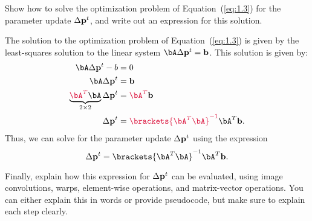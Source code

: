 \begin{problem}
\begin{enumroman}
    \item Show how to solve the optimization problem of Equation~(\ref{eq:1.3})
      for the parameter update $\Delta \mathbf{p}^t$, and write out an expression
      for this solution.

      \begin{answer}
        The solution to the optimization problem of Equation~(\ref{eq:1.3})
        is given by the least-squares solution to the linear system
        $\bA \Delta \bp^t = \bb$. This solution is given by:
        \begin{align*}
          \bA \Delta \bp^t - b &= 0 \\
          \bA \Delta \bp^t &= \bb \\
          \underbrace{\crim{\bA^T} \bA}_{2 \times 2} \Delta \bp^t &= \crim{\bA^T} \bb \\
          \Delta \bp^t &= \crim{\brackets{\bA^T \bA}^{-1}} \bA^T \bb.
        \end{align*}
        Thus, we can solve for the parameter update $\Delta \mathbf{p}^t$ using the expression
        \begin{equation}
          \Delta \bp^t = \brackets{\bA^T \bA}^{-1} \bA^T \bb.
          \label{eq:ans:1.3}
        \end{equation}
      \end{answer}

    \newpage
    \item Finally, explain how this expression for $\Delta \mathbf{p}^t$ can be
      evaluated, using image convolutions, warps, element-wise operations,
      and matrix-vector operations. You can either explain this in words
      or provide pseudocode, but make sure to explain each step clearly.


\end{enumroman}
\end{problem}
